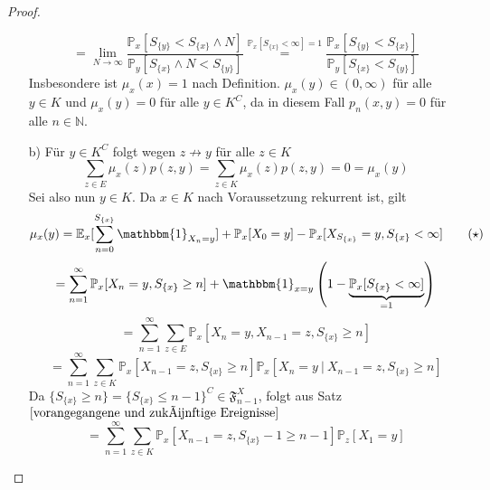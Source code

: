 \documentclass[a4paper,12pt]{scrartcl}
\theoremstyle{definition}
\begin{document}
\begin{proof}
\begin{itemize}
\begin{equation*}
\end{equation*}
\begin{equation*}
= \lim_{N \to \infty} \dfrac{\mathbb{P}_{x}[S_{\lbrace y \rbrace} < S_{\lbrace x \rbrace} \wedge N ]}{\mathbb{P}_{y}[S_{\lbrace x \rbrace} \wedge N < S_{\lbrace y \rbrace}]} \stackrel{\mathbb{P}_{x}[S_{\lbrace x \rbrace} < \infty]=1}{=} \dfrac{\mathbb{P}_{x}[S_{\lbrace y \rbrace} < S_{\lbrace x \rbrace}]}{\mathbb{P}_{y}[S_{\lbrace x \rbrace} < S_{\lbrace y \rbrace}]}
\end{equation*}
Insbesondere ist $\mu_{x}(x) =1$ nach Definition. $\mu_{x}(y) \in (0, \infty)$ für alle $y \in K$ und $\mu_{x}(y) = 0$ für alle $y \in K^{C}$, da in diesem Fall $p_{n}(x,y) = 0$ für alle $n \in \mathbb{N}$.
\item[b)] Für $y \in K^{C}$ folgt wegen $z \not\rightarrow y$ für alle $z \in K$
\begin{equation*}
\sum_{z \in E} \mu_{x}(z)p(z,y) = \sum_{z \in K}\mu_{x}(z)p(z,y) = 0 = \mu_{x}(y)
\end{equation*}
Sei also nun $y \in K$. Da $x \in K$ nach Voraussetzung rekurrent ist, gilt
\begin{equation*}
\mu_{x}(y) = \mathbb{E}_{x}[\sum_{n=0}^{S_{\lbrace x \rbrace}}  \mathbbm{1}_{X_{n} = y}] + \mathbb{P}_{x}[X_{0} = y] - \mathbb{P}_{x}[X_{S_{\lbrace x \rbrace}} = y, S_{\lbrace x \rbrace} < \infty]  \qquad (\star)
\end{equation*} 
\begin{equation*}
= \sum_{n=1}^{\infty} \mathbb{P}_{x}[X_{n}=y, S_{\lbrace x \rbrace} \geq n] + \mathbbm{1}_{x=y} \left( 1 - \underbrace{\mathbb{P}_{x}[S_{\lbrace x \rbrace} < \infty]}_{=1} \right)
\end{equation*}
\begin{equation*}
= \sum_{n=1}^{\infty} \sum_{z \in E}\mathbb{P}_{x}[X_{n}=y, X_{n-1} = z, S_{\lbrace x \rbrace} \geq n]
\end{equation*}
\begin{equation*}
= \sum_{n=1}^{\infty} \sum_{z \in K}\mathbb{P}_{x}[X_{n-1} = z, S_{\lbrace x \rbrace} \geq n]\mathbb{P}_{x}[X_{n}=y \: | \: X_{n-1} = z, S_{\lbrace x \rbrace} \geq n]
\end{equation*}
Da $\lbrace S_{\lbrace x \rbrace} \geq n \rbrace = {\lbrace S_{\lbrace x \rbrace} \leq n-1 \rbrace}^{C} \in \mathfrak{F}^{X}_{n-1} $, folgt aus Satz $\ref{vorangegangene und zukünftige Ereignisse}$
\begin{equation*}
= \sum_{n=1}^{\infty} \sum_{z \in K}\mathbb{P}_{x}[X_{n-1} = z, S_{\lbrace x \rbrace} - 1 \geq n-1]\mathbb{P}_{z}[X_{1}=y]

\end{equation*}
\end{itemize}
\end{proof}
\end{document}
